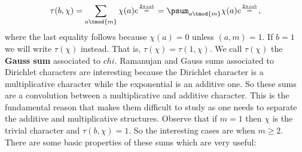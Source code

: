        \[
          \tau(b,\chi) = \sum_{a \tmod{m}}\chi(a)e^{\frac{2\pi iab}{m}} = \psum_{a \tmod{m}}\chi(a)e^{\frac{2\pi iab}{m}},
        \]
        where the last equality follows because $\chi(a) = 0$ unless $(a,m) = 1$. If $b = 1$ we will write $\tau(\chi)$ instead. That is, $\tau(\chi) = \tau(1,\chi)$. We call $\tau(\chi)$ the \textbf{Gauss sum} associated to $chi$. Ramanujan and Gauss sums associated to Dirichlet characters are interesting because the Dirichlet character is a multiplicative character while the exponential is an additive one. So these sums are a convolution between a multiplicative and additive character. This is the fundamental reason that makes them difficult to study as one needs to separate the additive and multiplicative structures. Observe that if $m = 1$ then $\chi$ is the trivial character and $\tau(b,\chi) = 1$. So the interesting cases are when $m \ge 2$. There are some basic properties of these sums which are very useful:

